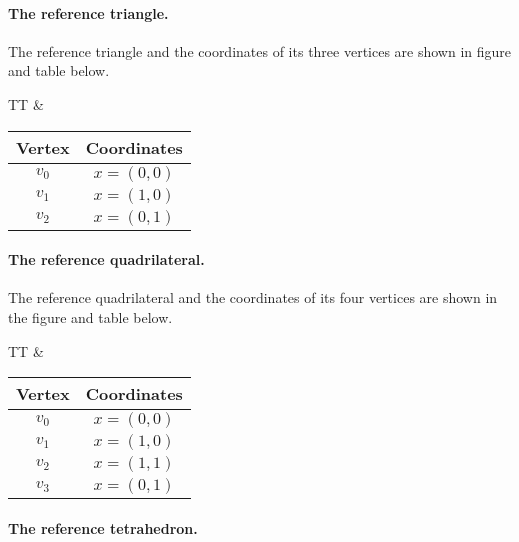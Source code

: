 \paragraph{The reference triangle.}

The reference triangle and the coordinates of its three vertices are
shown in figure and table below.

\begin{center}
  \begin{tabular}{TT}
    &
    \begin{tabular}{cc}
      \toprule
      Vertex & Coordinates \\
      \hline
      $v_0$ & $x = (0, 0)$ \\
      $v_1$ & $x = (1, 0)$ \\
      $v_2$ & $x = (0, 1)$ \\
      \bottomrule
    \end{tabular}
  \end{tabular}
\end{center}

\paragraph{The reference quadrilateral.}

The reference quadrilateral and the coordinates of its four vertices
are shown in the figure and table below.

\begin{center}
  \begin{tabular}{TT}
    &
    \begin{tabular}{cc}
      \toprule
      Vertex & Coordinates \\
      \hline
      $v_0$ & $x = (0, 0)$ \\
      $v_1$ & $x = (1, 0)$ \\
      $v_2$ & $x = (1, 1)$ \\
      $v_3$ & $x = (0, 1)$ \\
      \bottomrule
    \end{tabular}
  \end{tabular}
\end{center}

\paragraph{The reference tetrahedron.}

